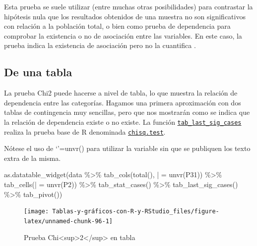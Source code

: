 \documentclass[
]{book}
\newenvironment{Shaded}{\begin{snugshade}}{\end{snugshade}}
\newcommand{\AttributeTok}[1]{\textcolor[rgb]{0.77,0.63,0.00}{#1}}
\newcommand{\FunctionTok}[1]{\textcolor[rgb]{0.00,0.00,0.00}{#1}}
\newcommand{\NormalTok}[1]{#1}
\newcommand{\OtherTok}[1]{\textcolor[rgb]{0.56,0.35,0.01}{#1}}
\newcommand{\SpecialCharTok}[1]{\textcolor[rgb]{0.00,0.00,0.00}{#1}}
\newcommand{\StringTok}[1]{\textcolor[rgb]{0.31,0.60,0.02}{#1}}
\begin{document}
Esta prueba se suele utilizar (entre muchas otras posibilidades) para contrastar la hipótesis nula que los resultados obtenidos de una muestra no son significativos con relación a la población total, o bien como prueba de dependencia para comprobar la existencia o no de asociación entre las variables. En este caso, la prueba indica la existencia de asociación pero no la cuantifica \citet{manzano1995}.

\hypertarget{de-una-tabla}{%
\subsection{De una tabla}\label{de-una-tabla}}

La prueba Chi2 puede hacerse a nivel de tabla, lo que muestra la relación de dependencia entre las categorías. Hagamos una primera aproximación con dos tablas de contingencia muy sencillas, pero que nos mostrarán como se indica que la relación de dependencia existe o no existe. La función \href{https://www.rdocumentation.org/packages/expss/versions/0.10.5/topics/tab_significance_options}{\texttt{tab\_last\_sig\_cases}} realiza la prueba base de R denominada \href{https://www.rdocumentation.org/packages/stats/versions/3.6.2/topics/chisq.test}{\texttt{chisq.test}}.

Nótese el uso de `\textbar{}'=unvr() para utilizar la variable sin que se publiquen los texto extra de la misma.

\begin{Shaded}
\begin{Highlighting}[]
\FunctionTok{as.datatable\_widget}\NormalTok{(data }\SpecialCharTok{\%\textgreater{}\%} \FunctionTok{tab\_cols}\NormalTok{(}\FunctionTok{total}\NormalTok{(), }\StringTok{\textasciigrave{}}\AttributeTok{|}\StringTok{\textasciigrave{}} \OtherTok{=} \FunctionTok{unvr}\NormalTok{(P31)) }\SpecialCharTok{\%\textgreater{}\%} 
  \FunctionTok{tab\_cells}\NormalTok{(}\StringTok{\textasciigrave{}}\AttributeTok{|}\StringTok{\textasciigrave{}} \OtherTok{=} \FunctionTok{unvr}\NormalTok{(P2)) }\SpecialCharTok{\%\textgreater{}\%} \FunctionTok{tab\_stat\_cases}\NormalTok{() }\SpecialCharTok{\%\textgreater{}\%} \FunctionTok{tab\_last\_sig\_cases}\NormalTok{() }\SpecialCharTok{\%\textgreater{}\%} 
  \FunctionTok{tab\_pivot}\NormalTok{())}
\end{Highlighting}
\end{Shaded}

\begin{figure}[H]

{\centering \texttt{[image: Tablas-y-gráficos-con-R-y-RStudio\_files/figure-latex/unnamed-chunk-96-1]} 

}

\caption{Prueba Chi<sup>2</sup> en tabla}\label{fig:unnamed-chunk-96}
\end{figure}
\end{document}
